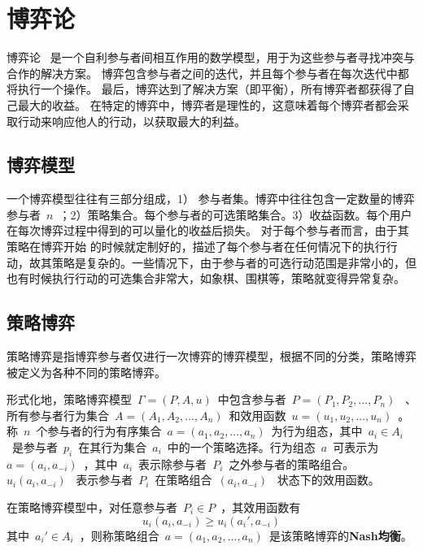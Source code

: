 
\section{博弈论}
博弈论~\cite{owen2001game,gibbons1992game} 是一个自利参与者间相互作用的数学模型，用于为这些参与者寻找冲突与合作的解决方案。 博弈包含参与者之间的迭代，并且每个参与者在每次迭代中都将执行一个操作。 最后，博弈达到了解决方案（即平衡），所有博弈者都获得了自己最大的收益。 在特定的博弈中，博弈者是理性的，这意味着每个博弈者都会采取行动来响应他人的行动，以获取最大的利益。


\subsection{博弈模型}

一个博弈模型往往有三部分组成，1） 参与者集。博弈中往往包含一定数量的博弈参与者~$n$~；2）策略集合。每个参与者的可选策略集合。3）收益函数。每个用户在每次博弈过程中得到的可以量化的收益后损失。
对于每个参与者而言，由于其策略在博弈开始 的时候就定制好的，描述了每个参与者在任何情况下的执行行动，故其策略是复杂的。一些情况下，由于参与者的可选行动范围是非常小的，但也有时候执行行动的可选集合非常大，如象棋、围棋等，策略就变得异常复杂。

\subsection{策略博弈}
策略博弈是指博弈参与者仅进行一次博弈的博弈模型，根据不同的分类，策略博弈被定义为各种不同的策略博弈。

形式化地，策略博弈模型~$\Gamma=(P,A,u)$~中包含参与者~$P=(P_1,P_2,...,P_n)$~   、所有参与者行为集合~$A=(A_1,A_2,...,A_n)$~和效用函数~$u=(u_1,u_2,...,u_n)$~。称~$n$~个参与者的行为有序集合~$a=(a_1,a_2,...,a_n)$~为行为组态，其中~$a_i \in A_i$~是参与者~$p_i$~在其行为集合~$a_i$~中的一个策略选择。行为组态~$a$~可表示为~$a=(a_i,a_{-i})$~，其中~$a_i$~表示除参与者~$P_i$~之外参与者的策略组合。~$u_i(a_i,a_{-i})$~ 表示参与者~$P_i$~在策略组合~$(a_i,a_{-i})$~ 状态下的效用函数。

\begin{definition}
	在策略博弈模型中，对任意参与者~$P_i \in P$~，其效用函数有
	\begin{equation}
	u_i(a_i,a_{-i}) \geq 	u_i(a_i',a_{-i})
	\end{equation}
	其中~$a_i'\in A_i$~，则称策略组合~$a=(a_1,a_2,...,a_n)$~是该策略博弈的\textbf{Nash均衡}。
\end{definition}


